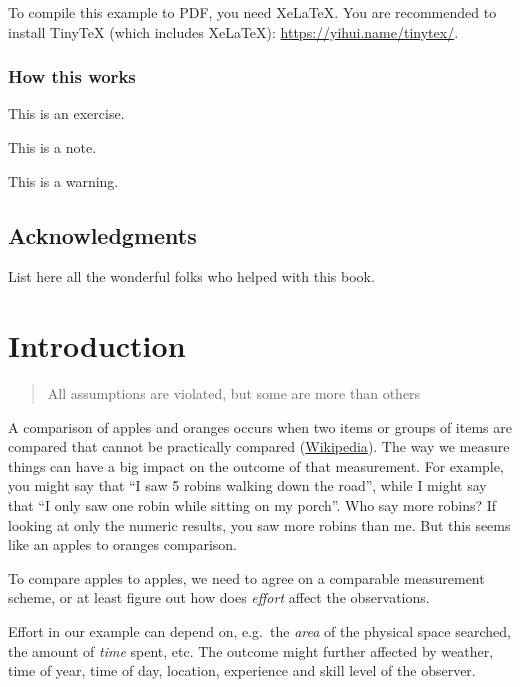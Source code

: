 \documentclass[12pt,]{book}
\let\BeginKnitrBlock\begin \let\EndKnitrBlock\end
\begin{document}
To compile this example to PDF, you need XeLaTeX. You are recommended to install TinyTeX (which includes XeLaTeX): \url{https://yihui.name/tinytex/}.

\hypertarget{how-this-works}{%
\subsection*{How this works}\label{how-this-works}}

\BeginKnitrBlock{rmdexercise}
This is an exercise.
\EndKnitrBlock{rmdexercise}

\BeginKnitrBlock{rmdnote}
This is a note.
\EndKnitrBlock{rmdnote}

\BeginKnitrBlock{rmdwarning}
This is a warning.
\EndKnitrBlock{rmdwarning}

\hypertarget{acknowledgments}{%
\section*{Acknowledgments}\label{acknowledgments}}

List here all the wonderful folks who helped with this book.

\hypertarget{intro}{%
\chapter{Introduction}\label{intro}}

\begin{quote}
All assumptions are violated, but some are more than others
\end{quote}

A comparison of apples and oranges occurs when two items or
groups of items are compared that cannot be practically compared
(\href{https://en.wikipedia.org/wiki/Apples_and_oranges}{Wikipedia}).
The way we measure things can have a big impact on the outcome
of that measurement. For example, you might say that
``I saw 5 robins walking down the road'', while I might say that
``I only saw one robin while sitting on my porch''.
Who say more robins? If looking at only the numeric results,
you saw more robins than me. But this seems like
an apples to oranges comparison.

To compare apples to apples, we need to agree on a comparable
measurement scheme, or at least figure out how does \emph{effort}
affect the observations.

Effort in our example can depend on,
e.g.~the \emph{area} of the physical space searched,
the amount of \emph{time} spent, etc.
The outcome might further affected by
weather, time of year, time of day, location,
experience and skill level of the observer.
\end{document}
